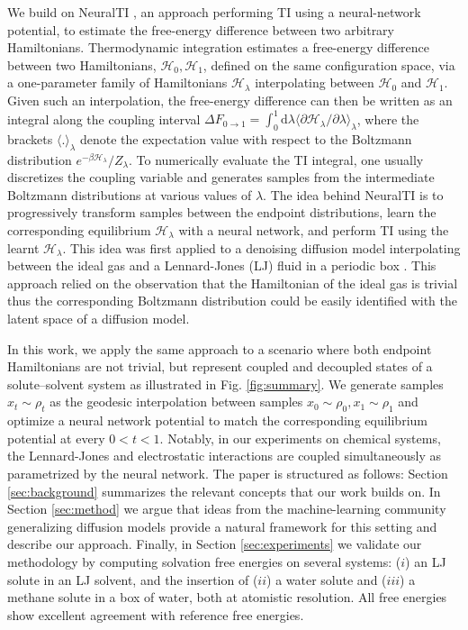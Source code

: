 \documentclass[%
onecolumn,
superscriptaddress,
nofootinbib,
amsmath,amssymb,
table
]{revtex4-2}
\begin{document}
We build on NeuralTI \citep{mate2024neural}, an approach performing  TI using a neural-network potential, to estimate the free-energy difference between two arbitrary Hamiltonians. Thermodynamic integration estimates a free-energy difference between two Hamiltonians, $\mathcal H_0, \mathcal H_1$, defined on the same configuration space, via a one-parameter family of Hamiltonians $\mathcal H_\lambda$ interpolating between $\mathcal H_0$ and  $\mathcal H_1$. Given such an interpolation, the free-energy difference can then be written as an integral along the coupling interval $\Delta F_{0\to 1} = \int_0^1 \mathrm d \lambda  \langle  \partial \mathcal H_\lambda /\partial \lambda \rangle_\lambda$, where the brackets $\langle  .\rangle_\lambda$ denote the expectation value with respect to the Boltzmann distribution $e^{-\beta \mathcal H_\lambda}/{Z_\lambda}$. To numerically evaluate the TI integral, one usually discretizes the coupling variable  and generates  samples from the intermediate Boltzmann distributions at various values of $\lambda$. The idea behind NeuralTI  is to progressively transform samples between the endpoint distributions, learn the corresponding equilibrium $\mathcal H_\lambda$ with a neural network, and perform TI using the learnt $\mathcal H_\lambda$. This idea was first applied to a denoising diffusion model interpolating between the ideal gas and a Lennard-Jones (LJ) fluid in a periodic box \citep{mate2024neural}. This approach relied on the observation that the Hamiltonian of the ideal gas is trivial thus the corresponding Boltzmann distribution could be easily identified with the latent space of a diffusion model.


In this work, we apply the same approach to a scenario where both endpoint Hamiltonians are not trivial, but represent  coupled and decoupled states of a solute--solvent system as illustrated in Fig. \ref{fig:summary}. We generate samples $x_t\sim \rho_t$ as the geodesic interpolation between samples $x_0 \sim \rho_0, x_1 \sim \rho_1$ and optimize a neural network potential to match the corresponding equilibrium potential at every $0<t<1$.  Notably, in our experiments on chemical systems, the Lennard-Jones and electrostatic interactions are coupled simultaneously as parametrized by the neural network.
The paper is structured as follows: Section \ref{sec:background} summarizes the relevant concepts that our work builds on. In Section \ref{sec:method} we argue that ideas from the machine-learning community generalizing diffusion models provide a natural framework for this setting \cite{lipman2022flow, albergo2023buildingnormalizingflowsstochastic, albergo2023stochasticinterpolantsunifyingframework} and describe our approach. Finally, in Section \ref{sec:experiments} we validate our methodology by computing solvation free energies on several systems: ($i$) an LJ solute in an LJ solvent, and the insertion of ($ii$) a water solute and ($iii$) a methane solute in a box of water, both at atomistic resolution. All free energies show excellent agreement with reference free energies.
\end{document}
